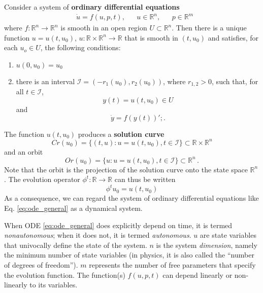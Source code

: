 \begin{theorem} \label{th:ODE}
	Consider a system of \textbf{ordinary differential equations}
	\begin{equation}
		\begin{aligned}
			& \dot{u} = f(u,p,t),    &&        u \in \mathbb{R}^n,       &&  p \in \mathbb{R}^m
			\label{eq:ode_general}
		\end{aligned}
	\end{equation}
	where $f: \mathbb{R}^{n} \to \mathbb{R}^{n}$ is smooth in an open region $U \subset \mathbb{R}^{n}$. Then there is a unique function $u = u(t,u_0)$, $u: \mathbb{R} \times \mathbb{R}^{n} \to \mathbb{R}$ that is smooth in $(t,u_0)$ and satisfies, for each $u_o \in U$, the following conditions:
	\renewcommand{\theenumi}{\roman{enumi}}%
	\begin{enumerate}
		\item $u(0,u_0)=u_0$
		\item there is an interval $\mathcal{I}=(-r_1(u_0),r_2(u_0))$, where $r_{1,2}>0$, such that, for all $t \in \mathcal{I}$,
		\begin{equation*}
			y(t) = u(t,u_0) \in U
		\end{equation*}
		and
		\begin{equation*}
			\dot{y} = f(y(t)) '; .
		\end{equation*}
	\end{enumerate}
	The function $u(t,u_0)$ produces a \textbf{solution curve}
	\begin{equation*}
		Cr(u_0) = \{ (t,u):u=u(t,u_0), t\in \mathcal{I} \}  \subset \mathbb{R} \times \mathbb{R}^{n}
	\end{equation*}
	and an orbit 
	\begin{equation*}
		Or(u_0) = \{ u:u=u(t,u_0), t\in \mathcal{I} \}  \subset \mathbb{R}^{n} \, .
	\end{equation*}
	Note that the orbit is the projection of the solution curve onto the state space $\mathbb{R}^{n}$. The evolution operator $\phi^t: \mathbb{R} \to \mathbb{R}$ can thus be written
	\begin{equation*}
		\phi^t u_0 = u(t,u_0)
	\end{equation*}
	As a consequence, we can regard the system of ordinary differential equations like Eq. \ref{eq:ode_general} as a dynamical system. 
\end{theorem}
When \gls{ODE} \ref{eq:ode_general} does explicitly depend on time, it is termed \textit{nonautonomous}; when it does not, it is termed \textit{autonomous}. $u$ are state variables that univocally define the state of the system. $n$ is the system \textit{dimension}, namely the minimum number of state variables (in physics, it is also called the ``number of degrees of freedom''). $m$ represents the number of free parameters that specify the evolution function. The function(s) $f(u,p,t)$ can depend linearly or non-linearly to its variables.




